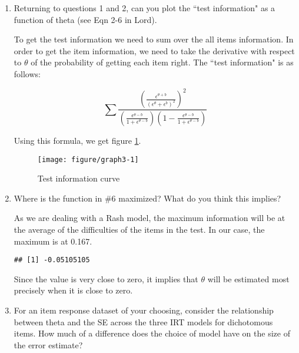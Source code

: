 \documentclass{article}\usepackage[]{graphicx}\usepackage[]{color}
\makeatletter
\def\maxwidth{ %
  \ifdim\Gin@nat@width>\linewidth
    \linewidth
  \else
    \Gin@nat@width
  \fi
}
\newenvironment{kframe}{%
 \def\at@end@of@kframe{}%
 \ifinner\ifhmode%
  \def\at@end@of@kframe{\end{minipage}}%
  \begin{minipage}{\columnwidth}%
 \fi\fi%
 \def\FrameCommand##1{\hskip\@totalleftmargin \hskip-\fboxsep
 \colorbox{shadecolor}{##1}\hskip-\fboxsep
     \hskip-\linewidth \hskip-\@totalleftmargin \hskip\columnwidth}%
 \MakeFramed {\advance\hsize-\width
   \@totalleftmargin\z@ \linewidth\hsize
   \@setminipage}}%
 {\par\unskip\endMakeFramed%
 \at@end@of@kframe}
\newenvironment{knitrout}{}{} %
\newcommand\ddfrac[2]{\frac{\displaystyle #1}{\displaystyle #2}}
\makeatother
\begin{document}
\begin{enumerate}
\item Returning to questions 1 and 2, can you plot the ``test information" as a function of theta (see Eqn 2-6 in Lord). 

To get the test information we need to sum over the all items information. In order to get the item information, we need to take the derivative with respect to $\theta$ of the probability of getting each item right. The ``test information" is as follows:

$$ \displaystyle\sum \ddfrac{\left(\ddfrac{\epsilon^{\theta+b}}{\left(\epsilon^{\theta}+\epsilon^{b}\right)^2}\right)^2}{\left(\ddfrac{\epsilon^{\theta-b}}{1+ \epsilon^{\theta-b}}\right) \left(1 - \ddfrac{\epsilon^{\theta-b}}{1 + \epsilon^{\theta-b}}\right)} $$

Using this formula, we get figure \ref{fig:graph3}.

\begin{knitrout}
\color{fgcolor}\begin{figure}[H]

{\centering \texttt{[image: figure/graph3-1]} 

}

\caption[Test information curve]{Test information curve}\label{fig:graph3}
\end{figure}


\end{knitrout}

\item Where is the function in \#6 maximized? What do you think this implies? 

As we are dealing with a Rash model, the maximum information will be at the average of the difficulties of the items in the test. In our case, the maximum is at 0.167.

\begin{knitrout}
\color{fgcolor}\begin{kframe}
\begin{verbatim}
## [1] -0.05105105
\end{verbatim}
\end{kframe}
\end{knitrout}

Since the value is very close to zero, it implies that $\theta$ will be
estimated most precisely when it is close to zero.


\item For an item response dataset of your choosing, consider the relationship between theta and the SE across the three IRT models for dichotomous items. How much of a difference does the choice of model have on the size of the error estimate?


\end{enumerate}
\end{document}
